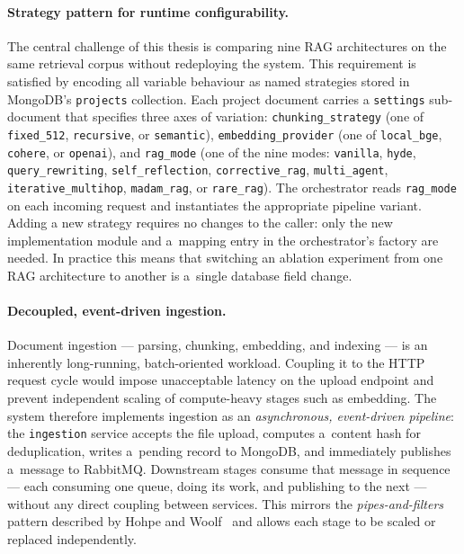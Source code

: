 \paragraph{Strategy pattern for runtime configurability.}
The central challenge of this thesis is comparing nine RAG architectures
on the same retrieval corpus without redeploying the system.  This requirement
is satisfied by encoding all variable behaviour as named strategies stored in
MongoDB's \texttt{projects} collection.  Each project document carries a
\texttt{settings} sub-document that specifies three axes of variation:
\texttt{chunking\_strategy} (one of \texttt{fixed\_512}, \texttt{recursive}, or
\texttt{semantic}), \texttt{embedding\_provider} (one of \texttt{local\_bge},
\texttt{cohere}, or \texttt{openai}), and \texttt{rag\_mode} (one of the nine
modes: \texttt{vanilla}, \texttt{hyde}, \texttt{query\_rewriting},
\texttt{self\_reflection}, \texttt{corrective\_rag}, \texttt{multi\_agent},
\texttt{iterative\_multihop}, \texttt{madam\_rag}, or \texttt{rare\_rag}).
The orchestrator reads \texttt{rag\_mode} on each
incoming request and instantiates the appropriate pipeline variant.  Adding a
new strategy requires no changes to the caller: only the new implementation
module and a~mapping entry in the orchestrator's factory are needed.  In
practice this means that switching an ablation experiment from one RAG
architecture to another is a~single database field change.

\paragraph{Decoupled, event-driven ingestion.}
Document ingestion --- parsing, chunking, embedding, and indexing --- is an
inherently long-running, batch-oriented workload.  Coupling it to the HTTP
request cycle would impose unacceptable latency on the upload endpoint and
prevent independent scaling of compute-heavy stages such as embedding.
The system therefore implements ingestion as an \emph{asynchronous,
event-driven pipeline}: the \texttt{ingestion} service accepts the file
upload, computes a~content hash for deduplication, writes a~pending record
to MongoDB, and immediately publishes a~message to RabbitMQ.  Downstream
stages consume that message in sequence --- each consuming one queue, doing
its work, and publishing to the next --- without any direct coupling between
services.  This mirrors the \emph{pipes-and-filters} pattern
described by Hohpe and Woolf~\cite{hohpe2003enterprise} and allows each
stage to be scaled or replaced independently.

